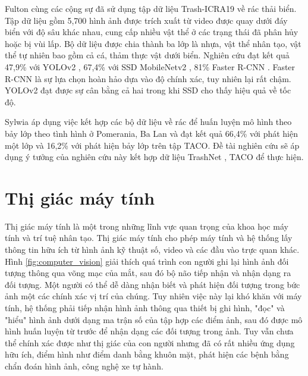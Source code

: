 \documentclass[../the.tex]{subfiles}
\begin{document}
\bigskip

{\fontsize{13}{12} \selectfont
	Fulton cùng các cộng sự \cite{8793975} đã sử dụng tập dữ liệu Trash-ICRA19 về rác thải biển. Tập dữ liệu gồm 5,700 hình ảnh được trích xuất từ video được quay dưới đáy biển với độ sâu khác nhau,
	cung cấp nhiều vật thể ở các trạng thái đã phân hủy hoặc bị vùi lấp.
	Bộ dữ liệu được chia thành ba lớp là nhựa, vật thể nhân tạo, vật thể tự nhiên bao gồm cả cá, thảm thực vật dưới biển.
	Nghiên cứu đạt kết quả 47,9\% với YOLOv2 \cite{redmon2016yolo9000}, 67,4\% với SSD MobileNetv2 \cite{sandler2019mobilenetv2} , 81\% Faster R-CNN \cite{ren2016faster}.
	Faster R-CNN là sự lựa chọn hoàn hảo dựa vào độ chính xác, tuy nhiên lại rất chậm. YOLOv2 đạt được sự cân bằng cả hai trong khi SSD cho thấy hiệu quả về tốc độ.

}

\bigskip

{\fontsize{13}{12} \selectfont

	Sylwia \etal  \cite{Majchrowska_2022} áp dụng việc kết hợp các bộ dữ liệu về rác để huấn luyện mô hình theo bảy lớp theo tình hình ở Pomerania, Ba Lan và đạt kết quả 66,4\% với phát hiện một lớp và 16,2\% với phát hiện bảy lớp trên tập TACO.
	Đề tài nghiên cứu sẽ áp dụng ý tưởng của nghiên cứu này \cite{Majchrowska_2022} kết hợp dữ liệu TrashNet \cite{yang2016classification}, TACO \cite{proença2020taco} để thực hiện.

}

\section{Thị giác máy tính}
\label{sec:ttmt}

{\fontsize{13}{12}\selectfont

	Thị giác máy tính là một trong những lĩnh vực quan trọng của khoa học máy tính và trí tuệ nhân tạo. Thị giác máy tính cho phép máy tính và hệ thống lấy thông tin hữu ích từ hình ảnh kỹ thuật số, video và các đầu vào trực quan khác. Hình \ref{fig:computer_vision} giải thích quá trình con người ghi lại hình ảnh đối tượng thông qua võng mạc của mắt, sau đó bộ não tiếp nhận và nhận dạng ra đối tượng.
	Một người có thể dễ dàng nhận biết và phát hiện đối tượng trong bức ảnh một các chính xác vị trí của chúng. Tuy nhiên việc này lại khó khăn với máy tính, hệ thống phải tiếp nhận hình ảnh thông qua thiết bị ghi hình, "đọc" và "hiểu" hình ảnh dưới dạng ma trận số của tập hợp các điểm ảnh, sau đó được mô hình huấn luyện từ trước để nhận dạng các đối tượng trong ảnh. Tuy vẫn chưa thể chính xác được như thị giác của con người nhưng đã có rất nhiều ứng dụng hữu ích, điểm hình như điểm danh bằng khuôn mặt, phát hiện các bệnh bằng chẩn đoán hình ảnh, công nghệ xe tự hành.

}
\end{document}
